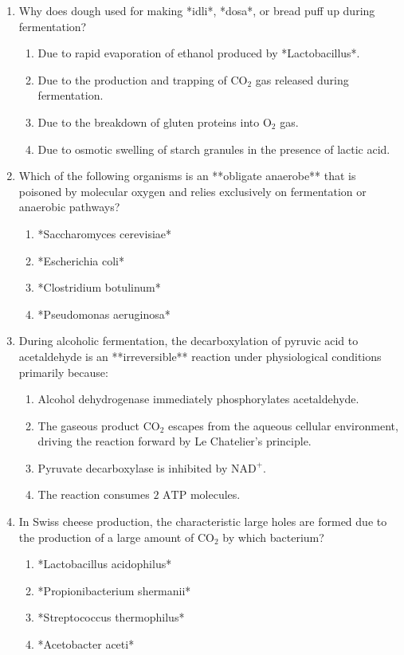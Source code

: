 \documentclass[11pt, a4paper]{article}
\begin{document}
\begin{enumerate}[label=\textbf{\arabic*.}]
\item Why does dough used for making *idli*, *dosa*, or bread puff up during fermentation?
\begin{enumerate}[label=(\Alph*)]
    \item Due to rapid evaporation of ethanol produced by *Lactobacillus*.
    \item Due to the production and trapping of $\text{CO}_2$ gas released during fermentation.
    \item Due to the breakdown of gluten proteins into $\text{O}_2$ gas.
    \item Due to osmotic swelling of starch granules in the presence of lactic acid.
\end{enumerate}

\item Which of the following organisms is an **obligate anaerobe** that is poisoned by molecular oxygen and relies exclusively on fermentation or anaerobic pathways?
\begin{enumerate}[label=(\Alph*)]
    \item *Saccharomyces cerevisiae*
    \item *Escherichia coli*
    \item *Clostridium botulinum*
    \item *Pseudomonas aeruginosa*
\end{enumerate}

\item During alcoholic fermentation, the decarboxylation of pyruvic acid to acetaldehyde is an **irreversible** reaction under physiological conditions primarily because:
\begin{enumerate}[label=(\Alph*)]
    \item Alcohol dehydrogenase immediately phosphorylates acetaldehyde.
    \item The gaseous product $\text{CO}_2$ escapes from the aqueous cellular environment, driving the reaction forward by Le Chatelier's principle.
    \item Pyruvate decarboxylase is inhibited by $\text{NAD}^+$.
    \item The reaction consumes $2\text{ ATP}$ molecules.
\end{enumerate}

\item In Swiss cheese production, the characteristic large holes are formed due to the production of a large amount of $\text{CO}_2$ by which bacterium?
\begin{enumerate}[label=(\Alph*)]
    \item *Lactobacillus acidophilus*
    \item *Propionibacterium shermanii*
    \item *Streptococcus thermophilus*
    \item *Acetobacter aceti*
\end{enumerate}


\end{enumerate}
\end{document}
